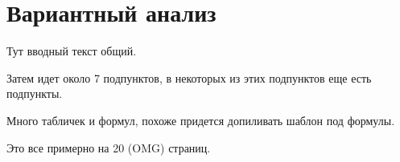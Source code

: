 \section{Вариантный анализ}

Тут вводный текст общий.

Затем идет около 7 подпунктов, в некоторых из этих подпунктов еще есть подпункты.

Много табличек и формул, похоже придется допиливать шаблон под формулы.

Это все примерно на 20 (OMG) страниц.


\clearpage
